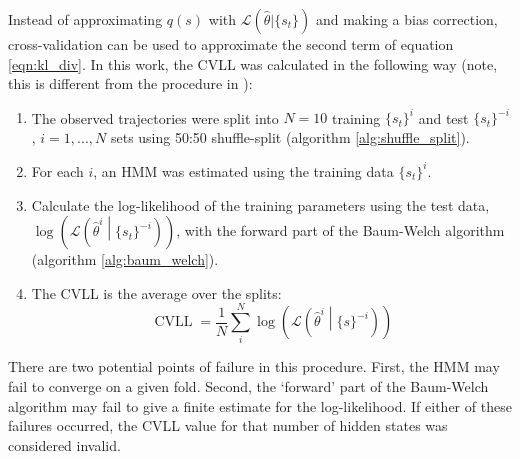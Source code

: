 Instead of approximating $q(s)$ with $\mathcal{L}\left(\hat{\theta}|\{s_t\}\right)$ and making a bias correction, cross-validation can be used to approximate the second term of equation \ref{eqn:kl_div}\cite{celeuxSelectingHiddenMarkov2008}. In this work, the CVLL was calculated in the following way (note, this is different from the procedure in \cite{celeuxSelectingHiddenMarkov2008}): 
\begin{enumerate}
    \item The observed trajectories were split into $N = 10$ training $\{s_t\}^{i}$ and test $\{s_t\}^{-i}$, $i = 1, ..., N$ sets using 50:50 shuffle-split (algorithm \ref{alg:shuffle_split}). 
    \item For each $i$, an HMM was estimated using the training data $\{s_t\}^{i}$. 
    \item Calculate the log-likelihood of the training parameters using the test data,  $\log{\left(\mathcal{L}\left(\hat{\theta}^{i}\middle|\{s_t\}^{-i}\right)\right)}$, with the forward part of the Baum-Welch algorithm (algorithm \ref{alg:baum_welch}). 
    \item The CVLL is the average over the splits: 
    \begin{equation}
        \operatorname{CVLL} = \frac{1}{N}\sum_{i}^{N}\log{\left(\mathcal{L}\left(\hat{\theta}^{i} \middle | \{s\}^{-i}\right)\right)}
    \end{equation}
\end{enumerate}
There are two potential points of failure in this procedure. First, the HMM may fail to converge on a given fold. Second, the `forward' part of the Baum-Welch algorithm may fail to give a finite estimate for the log-likelihood. If either of these failures occurred, the CVLL value for that number of hidden states was considered invalid. 

